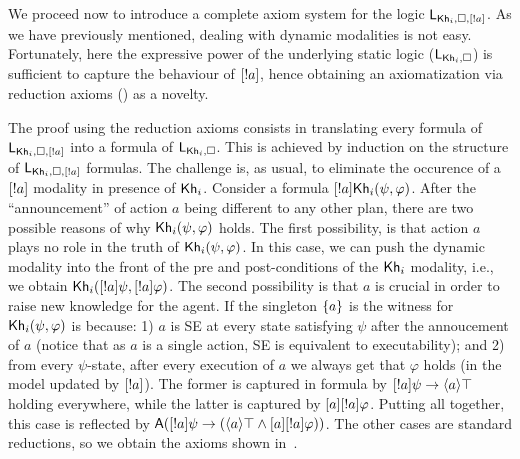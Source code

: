 We proceed now to introduce a complete axiom system for the logic $\mathsf{L}_{{\sf Kh}_i,\square,[!a]}$. As we have previously mentioned, dealing with dynamic modalities is not easy. Fortunately, here the expressive power of the underlying static logic ($\mathsf{L}_{{\sf Kh}_i,\square}$) is sufficient to capture the behaviour of $[!a]$, hence obtaining an axiomatization via reduction axioms () as a novelty.

The proof using the reduction axioms consists in translating every formula of $\mathsf{L}_{{\sf Kh}_i,\square,[!a]}$ into a formula of $\mathsf{L}_{{\sf Kh}_i,\square}$. This is achieved by induction on the structure of $\mathsf{L}_{{\sf Kh}_i,\square,[!a]}$ formulas. The challenge is, as usual, to eliminate the occurence of a $[!a]$ modality in presence of ${\sf Kh}_i$. Consider a formula $[!a]{\sf Kh}_i(\psi,\varphi)$. After the ``announcement'' of action $a$ being different to any other plan, there are two possible reasons of why ${\sf Kh}_i(\psi,\varphi)$ holds. The first possibility, is that action $a$ plays no role in the truth of ${\sf Kh}_i(\psi,\varphi)$. In this case, we can push the dynamic modality into the front of the pre and post-conditions of the ${\sf Kh}_i$ modality, i.e., we obtain ${\sf Kh}_i([!a]\psi,[!a]\varphi)$. The second possibility is that $a$ is crucial in order to raise new knowledge for the agent. If the singleton $\{ a \}$ is the witness for ${\sf Kh}_i(\psi,\varphi)$ is because: 1) $a$ is SE at every state satisfying $\psi$ after the annoucement of $a$ (notice that as $a$ is a single action, SE is equivalent to executability); and 2) from every $\psi$-state, after every execution of $a$ we always get that $\varphi$ holds (in the model updated by $[!a]$). The former is captured in formula by $[!a]\psi\rightarrow\langle a \rangle\top$ holding everywhere, while the latter is captured by $[a][!a]\varphi$. Putting all together, this case is reflected by ${\sf A}([!a]\psi\rightarrow(\langle a \rangle\top\wedge[a][!a]\varphi))$. The other cases are standard reductions, so we obtain the axioms shown in~.

